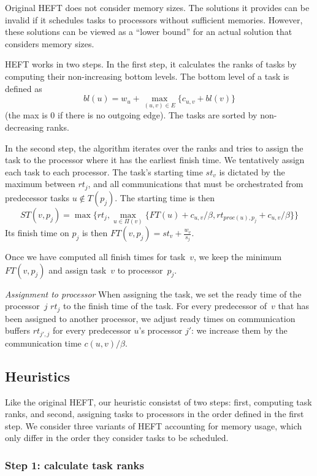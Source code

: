 \documentclass[conference]{IEEEtran}
\begin{document}
    Original HEFT does not consider memory sizes.
    The solutions it provides can be invalid if it schedules tasks to processors without sufficient memories.
    However, these solutions can be viewed as a ``lower bound'' for an actual solution that considers memory sizes.

    HEFT works in two steps.
    In the first step, it calculates the ranks of tasks by computing their non-increasing bottom levels.
    The bottom level of a task is defined as
    $$bl(u) = w_u + \max_{(u,v)\in E} \{c_{u,v} + bl(v)\}$$
    (the max is 0 if there is no outgoing edge).
    The tasks are sorted by non-decreasing ranks.

    In the second step, the algorithm iterates over the ranks and tries to assign the task to the processor where it
    has the earliest finish time.
    We tentatively assign each task to each processor.
    The task's starting time $st_v$ is dictated by the maximum between $rt_j$, and all communications that
    must be orchestrated from predecessor tasks $u\notin T(p_j)$.
    The starting time is then
    \[ST(v, p_j) = \max{ \{rt_j, \max_{ u \in \Pi(v)}\{ FT(u)+ c_{u,v} / \beta , rt_{proc(u), p_j} + c_{u,v} / \beta  \} \} } \]
    Its finish time on $p_j$ is then
    $FT(v,p_j) = st_v + \frac{w_v}{s_j}$.

    Once we have computed all finish times for task~$v$,
    we keep the minimum $FT(v,p_j)$ and assign task~$v$
    to processor~$p_j$.

    \textit{Assignment to processor}
    When assigning the task, we set the ready time of the processor~$j$ $rt_j$ to the finish time of the task.
    For every predecessor of~$v$ that has been assigned to another processor, we adjust ready times on
    communication buffers $rt_{j', j}$ for every predecessor $u$'s processor $j'$: we increase them by the
    communication time $c( u,v) / \beta$.

    \subsection{Heuristics}
    Like the original HEFT, our heuristic consistst of two steps: first, computing task ranks,
    and second, assigning tasks to processors in the order defined in the first step.
    We consider three variants of HEFT accounting for memory usage, which only
    differ in the order they consider tasks to be scheduled.

    \subsubsection{Step 1: calculate task ranks}
\end{document}
